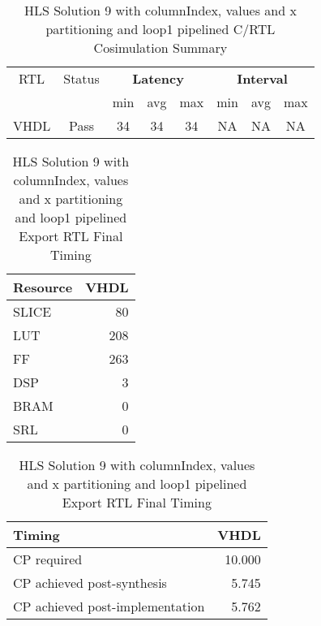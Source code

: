 \begin{table}[H]
	\centering
	\begin{tabular}{|c|c|c|c|c|c|c|c|}
		\hline
		\multicolumn{1}{|c|}{RTL} & \multicolumn{1}{|c|}{Status} & \multicolumn{3}{c|}{\textbf{Latency}} & \multicolumn{3}{c|}{\textbf{Interval}} \\
		&  & min & avg & max & min & avg & max \\
		\hline
		VHDL & Pass & 34 & 34 & 34 & NA & NA & NA \\
		\hline
	\end{tabular}
	\caption{HLS Solution 9 with columnIndex, values and x partitioning and loop1 pipelined C/RTL Cosimulation Summary }
	\label{tab:hls-solution-7-loop1-pipeline-cosimulation-summary}
\end{table}

\begin{table}[H]
	\centering
	\begin{minipage}[t]{0.45\linewidth}
		\centering
		\begin{tabular}{|l|r|}
			\hline
			\textbf{Resource} & \textbf{VHDL} \\
			\hline
			SLICE & 80 \\
			\hline
			LUT & 208 \\
			\hline
			FF & 263 \\
			\hline
			DSP & 3 \\
			\hline
			BRAM & 0 \\
			\hline
			SRL & 0 \\
			\hline
		\end{tabular}
		\caption{HLS Solution 9 with columnIndex, values and x partitioning and loop1 pipelined Export RTL Resource Usage}
		\label{tab:hls-solution-7-loop1-pipeline-export-rtl-resoruce-usage}
	\end{minipage}
	\hfill
	\begin{minipage}[t]{0.45\linewidth}
		\centering
		\begin{tabular}{|l|r|}
			\hline
			\textbf{Timing} & \textbf{VHDL} \\
			\hline
			CP required & 10.000 \\
			\hline
			CP achieved post-synthesis & 5.745 \\
			\hline
			CP achieved post-implementation & 5.762 \\
			\hline
		\end{tabular}
		\caption{HLS Solution 9 with columnIndex, values and x partitioning and loop1 pipelined Export RTL Final Timing}
		\label{tab:hls-solution-7-loop1-pipeline-export-rtl-final-timing}
	\end{minipage}
\end{table}